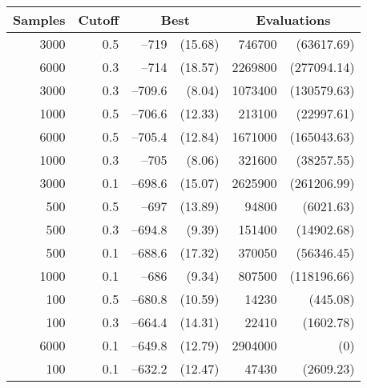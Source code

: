\begin{table}[tbp]
\centering
\caption{}
\begin{tabular}{|r|r|rr|rr|}
\hline
\multicolumn{1}{|c|}{Samples} & \multicolumn{1}{c|}{Cutoff} &
 \multicolumn{2}{c|}{Best} & 
 \multicolumn{2}{c|}{Evaluations}  \\ \hline
3000 & 0.5 & --719 &  (15.68) & 746700 & (63617.69) \\ \hline
6000 & 0.3 & --714 &  (18.57) & 2269800 &  (277094.14) \\ \hline
3000 & 0.3 & --709.6 &  (8.04) & 1073400 &  (130579.63) \\ \hline
1000 & 0.5 & --706.6 &  (12.33) & 213100 &  (22997.61) \\ \hline
6000 & 0.5 & --705.4 &  (12.84) & 1671000 &  (165043.63) \\ \hline
1000 & 0.3 & --705 &  (8.06) & 321600 &  (38257.55) \\ \hline
3000 & 0.1 & --698.6 &  (15.07) & 2625900 &  (261206.99) \\ \hline
500 & 0.5 & --697 &  (13.89) & 94800 &  (6021.63) \\ \hline
500 & 0.3 & --694.8 &  (9.39) & 151400 &  (14902.68) \\ \hline
500 & 0.1 & --688.6 &  (17.32) & 370050 &  (56346.45) \\ \hline
1000 & 0.1 & --686 &  (9.34) & 807500 &  (118196.66) \\ \hline
100 & 0.5 & --680.8 &  (10.59) & 14230 &  (445.08) \\ \hline
100 & 0.3 & --664.4 &  (14.31) & 22410 &  (1602.78) \\ \hline
6000 & 0.1 & --649.8 &  (12.79) & 2904000 &  (0) \\ \hline
100 & 0.1 & --632.2 &  (12.47) & 47430 &  (2609.23) \\ \hline
\end{tabular}
\label{ann-2d-ising}
\end{table}

